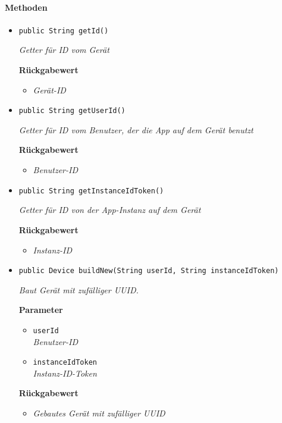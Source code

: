      \paragraph*{Methoden}
     \begin{itemize}
     	\item{\texttt{public String getId()}}
     	
     	\textit{Getter für ID vom Gerät}
     	
     	\textbf{Rückgabewert}
     	\begin{itemize}
     		\item\textit{Gerät-ID}
     	\end{itemize}
     
     \item{\texttt{public String getUserId()}}
     	
     	\textit{Getter für ID vom Benutzer, der die App auf dem Gerät benutzt}
     	
     	\textbf{Rückgabewert}
     	\begin{itemize}
     		\item\textit{Benutzer-ID}
     	\end{itemize}
     
     \item{\texttt{public String getInstanceIdToken()}}
     	
     	\textit{Getter für ID von der App-Instanz auf dem Gerät}
     	
     	\textbf{Rückgabewert}
     	\begin{itemize}
     		\item\textit{Instanz-ID}
     	\end{itemize}
     
     \item{\texttt{public Device buildNew(String userId, String instanceIdToken)}}
     	
     	\textit{Baut Gerät mit zufälliger UUID.}
     	
     	\textbf{Parameter}
     	\begin{itemize}
     		\item\texttt{userId}\\
     		\textit{Benutzer-ID} 
     		\item\texttt{instanceIdToken}\\
     		\textit{Instanz-ID-Token}
     	\end{itemize}
     	
     	\textbf{Rückgabewert}
     	\begin{itemize}
     		\item\textit{Gebautes Gerät mit zufälliger UUID}
     	\end{itemize}
     \end{itemize}
 
